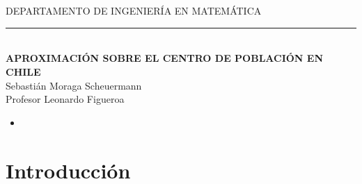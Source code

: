 \documentclass[20pt]{report}
\begin{document}
\begin{center}
\\
\\

{DEPARTAMENTO DE INGENIER\'IA EN MATEM\'ATICA}
\end{center}
\begin{center}
\noindent\rule{15cm}{.5pt}\\
\vspace{2cm}
\textbf{\Large{APROXIMACI\'ON SOBRE EL CENTRO DE POBLACI\'ON EN CHILE}}\\

\Large{Sebasti\'an Moraga Scheuermann}\\

\Large{Profesor Leonardo Figueroa}\\

\end{center}



 \vspace{.2cm}
  \noindent
\begin{itemize}
\item [\bf ]{\bf    }
\topmargin=-1.6cm


\end{itemize}
\topmargin=-1.6cm
\vspace{3cm}
\noindent 






\pagebreak


 \tableofcontents %


\chapter{Introducci\'on}\label{cap.introduccion}
\end{document}
